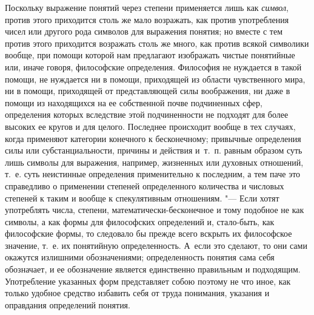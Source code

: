 Поскольку выражение понятий через степени применяется лишь как {\em символ},
против этого приходится столь же мало возражать, как против употребления чисел
или другого рода символов для выражения понятия; но вместе с тем против этого
приходится возражать столь же много, как против всякой символики вообще, при
помощи которой нам предлагают изображать чистые понятийные или, иначе говоря,
философские определения. Философия не нуждается в такой помощи, не нуждается ни
в помощи, приходящей из области чувственного мира, ни в помощи, приходящей от
представляющей силы воображения, ни даже в помощи из находящихся на ее
собственной почве подчиненных сфер, определения которых вследствие этой
подчиненности не подходят для более высоких ее кругов и для целого. Последнее
происходит вообще в тех случаях, когда применяют категории конечного к
бесконечному; привычные определения силы или субстанциальности, причины и
действия и~т.~п. равным образом суть лишь символы для выражения, например,
жизненных или духовных отношений, т.~е. суть неистинные определения
применительно к последним, а тем паче это справедливо о применении степеней
определенного количества и числовых степеней к таким и вообще к спекулятивным
отношениям. "--- Если хотят употреблять числа, степени,
математически-бесконечное и тому подобное не как символы, а как формы для
философских определений и, стало-быть, как философские формы, то следовало бы
прежде всего вскрыть их философское значение, т.~е. их понятийную
определенность. А~если это сделают, то они сами окажутся излишними
обозначениями; определенность понятия сама себя обозначает, и ее обозначение
является единственно правильным и подходящим. Употребление указанных форм
представляет собою поэтому не что иное, как только удобное средство избавить
себя от труда понимания, указания и оправдания определений понятия.

\bigskip
